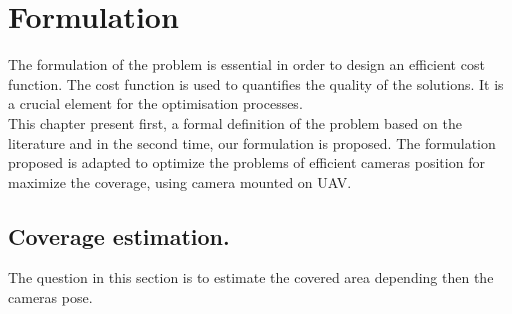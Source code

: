 \chapter{Formulation}
\minitoc
The formulation of the problem is essential in order to design an efficient cost function. The cost function is  used to quantifies the quality of the solutions. It is a crucial element for the optimisation processes.\\
This chapter present first, a formal definition  of the problem based on the literature and in the second time, our formulation is proposed. The formulation proposed is adapted to optimize the problems of efficient cameras position for maximize the coverage, using camera mounted on UAV.

\section{ Coverage estimation. }


 The question in this section is to estimate the covered area depending then the cameras pose.\\



